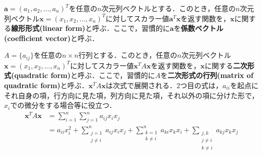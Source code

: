 \begin{defi}[線形形式]
${\bm a}=(a_1,a_2,\ldots,a_n)^T$を任意の$n$次元列ベクトルとする．このとき，任意の$n$次元列ベクトル${\bm x}=(x_1,x_2,\ldots,x_n)^T$に対してスカラー値${\bm a}^T{\bm x}$を返す関数を，${\bm x}$に関する{\bf 線形形式(linear form)}と呼ぶ．ここで，習慣的に${\bm a}$を{\bf 係数ベクトル(coefficient vector)}と呼ぶ．
\end{defi}

\begin{defi}[二次形式]
$A=\{a_{ij}\}$を任意の$n\times n$行列とする．このとき，任意の$n$次元列ベクトル${\bm x}=(x_1,x_2,\ldots,x_n)^T$に対してスカラー値${\bm x}^TA{\bm x}$を返す関数を，${\bm x}$に関する{\bf 二次形式(quadratic form)}と呼ぶ．ここで，習慣的に$A$を{\bf 二次形式の行列(matrix of quadratic form)}と呼ぶ．${\bm x}^TA{\bm x}$は次式で展開される．2つ目の式は，$a_{ii}$を起点にそれ自身の項，行方向に見た項，列方向に見た項，それ以外の項に分けた形で，$x_i$での微分をする場合等に役立つ．
\begin{align}
{\bm x}^TA{\bm x}&= \sum_{i=1}^n\sum_{j=1}^n a_{ij}x_ix_j\\
&=a_{ii}x_i^2+\sum_{\substack{j=1\\j\neq i}}^n a_{ij}x_ix_j+\sum_{\substack{k=1\\k\neq i}}^n a_{ki}x_kx_i+\sum_{\substack{j,k\\j\neq i\\k\neq i}}a_{kj}x_kx_j \label{quadform}
\end{align}
\end{defi}

